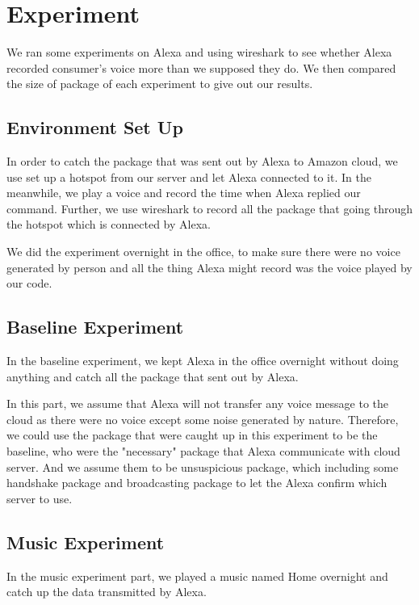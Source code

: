 \section{Experiment}

We ran some experiments on Alexa and using wireshark to see whether Alexa recorded consumer's voice more than we supposed they do. We then compared the size of package of each experiment to give out our results.

\subsection{Environment Set Up}

In order to catch the package that was sent out by Alexa to Amazon cloud, we use set up a hotspot from our server and let Alexa connected to it. In the meanwhile, we play a voice and record the time when Alexa replied our command. Further, we use wireshark to record all the package that going through the hotspot which is connected by Alexa. 

We did the experiment overnight in the office, to make sure there were no voice generated by person and all the thing Alexa might record was the voice played by our code.

\subsection{Baseline Experiment}

In the baseline experiment, we kept Alexa in the office overnight without doing anything and catch all the package that sent out by Alexa.

In this part, we assume that Alexa will not transfer any voice message to the cloud as there were no voice except some noise generated by nature. Therefore, we could use the package that were caught up in this experiment to be the baseline, who were the "necessary" package that Alexa communicate with cloud server. And we assume them to be unsuspicious package, which including some handshake package and broadcasting package to let the Alexa confirm which server to use.

\subsection{Music Experiment}

In the music experiment part, we played a music named Home overnight and catch up the data transmitted by Alexa.

